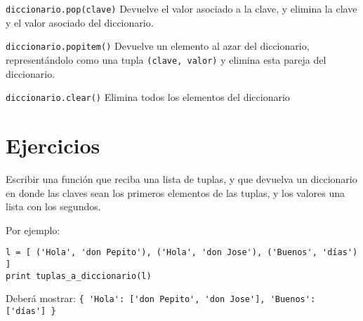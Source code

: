 \begin{referencia_python}
\begin{sintaxis}{\lstinline{diccionario.pop(clave)}}
Devuelve el valor asociado a la clave, y elimina la clave y el valor
asociado del diccionario.
\end{sintaxis}

\begin{sintaxis}{\lstinline{diccionario.popitem()}}
Devuelve un elemento al azar del diccionario, representándolo como una
tupla \lstinline{(clave, valor)} y elimina esta pareja del diccionario.
\end{sintaxis}

\begin{sintaxis}{\lstinline{diccionario.clear()}}
Elimina todos los elementos del diccionario
\end{sintaxis}

%
%

\end{referencia_python}


\newpage
\section{Ejercicios}

\begin{ejercicio}
Escribir una función que reciba una lista de tuplas, y que devuelva
un diccionario en donde las claves sean los primeros elementos de las
tuplas, y los valores una lista con los segundos.

Por ejemplo:
\begin{lstlisting}[numbers=none]
l = [ ('Hola', 'don Pepito'), ('Hola', 'don Jose'), ('Buenos', 'días') ]
print tuplas_a_diccionario(l)
\end{lstlisting}

Deberá mostrar: \lstinline!{ 'Hola': ['don Pepito', 'don Jose'], 'Buenos': ['días'] }!
\end{ejercicio}

